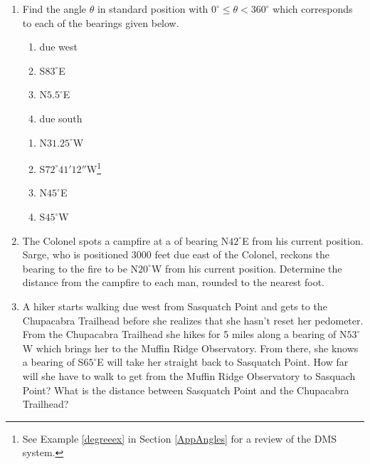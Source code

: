 \documentclass{ximera}
\begin{document}
\begin{enumerate}

\setcounter{enumi}{\value{HW}}

\item \label{bearingfirstexercise} Find the angle $\theta$ in standard position with $0^{\circ} \leq \theta < 360^{\circ}$ which corresponds to each of the bearings given below.
\enlargethispage{.25in}
\begin{multicols}{4}

\begin{enumerate}

\item due west
\item S$83^{\circ}$E
\item N$5.5^{\circ}$E
\item due south

\setcounter{HWindent}{\value{enumii}}

\end{enumerate}

\end{multicols}

\begin{multicols}{4} 

\begin{enumerate}

\setcounter{enumii}{\value{HWindent}}

\item N$31.25^{\circ}$W
\item S$72^{\circ}41'12''$W\footnote{See Example \ref{degreeex} in Section \ref{AppAngles} for a review of the DMS system.}
\item N$45^{\circ}$E
\item S$45^{\circ}$W

\end{enumerate}

\end{multicols}

\item  The Colonel spots a campfire at a of bearing N$42^{\circ}$E from his current position.  Sarge, who is positioned 3000 feet due east of the Colonel, reckons the bearing to the fire to be N$20^{\circ}$W from his current position.  Determine the distance from the campfire to each man, rounded to the nearest foot.

\item A hiker starts walking due west from Sasquatch Point and gets to the Chupacabra Trailhead before she realizes that she hasn't reset her pedometer.  From the Chupacabra Trailhead she hikes for 5 miles along a bearing of N$53^{\circ}$W which brings her to the Muffin Ridge Observatory.  From there, she knows a bearing of S$65^{\circ}$E will take her straight back to Sasquatch Point.  How far will she have to walk to get from the Muffin Ridge Observatory to Sasquach Point?  What is the distance between Sasquatch Point and the Chupacabra Trailhead?


\end{enumerate}
\end{document}
